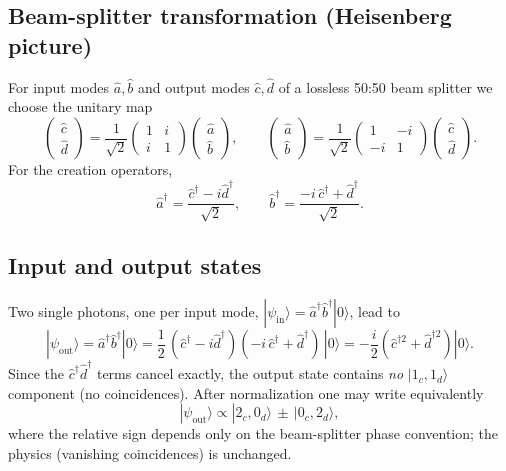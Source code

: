 \subsection*{Beam-splitter transformation (Heisenberg picture)}
For input modes \(\hat a,\hat b\) and output modes \(\hat c,\hat d\) of a lossless 50:50 beam splitter we choose the unitary map
\[
\begin{pmatrix}
	\hat c \\ \hat d
\end{pmatrix}
= \frac{1}{\sqrt{2}}
\begin{pmatrix}
	1 & i \\
	i & 1
\end{pmatrix}
\begin{pmatrix}
	\hat a \\ \hat b
\end{pmatrix},
\qquad
\begin{pmatrix}
	\hat a \\ \hat b
\end{pmatrix}
= \frac{1}{\sqrt{2}}
\begin{pmatrix}
	1 & -i \\
	-i & 1
\end{pmatrix}
\begin{pmatrix}
	\hat c \\ \hat d
\end{pmatrix}.
\]
For the creation operators,
\[
\hat a^\dagger=\frac{\hat c^\dagger - i \hat d^\dagger}{\sqrt{2}},
\qquad
\hat b^\dagger=\frac{-i\,\hat c^\dagger + \hat d^\dagger}{\sqrt{2}}.
\]

\subsection*{Input and output states}
Two single photons, one per input mode,
\(|\psi_{\text{in}}\rangle=\hat a^\dagger \hat b^\dagger |0\rangle\),
lead to
\[
|\psi_{\text{out}}\rangle
= \hat a^\dagger \hat b^\dagger |0\rangle
= \frac{1}{2}\,(\hat c^\dagger - i \hat d^\dagger)(-i\,\hat c^\dagger + \hat d^\dagger)\,|0\rangle
= -\frac{i}{2}\!\left(\hat c^{\dagger 2}+\hat d^{\dagger 2}\right)|0\rangle.
\]
Since the \(\hat c^\dagger \hat d^\dagger\) terms cancel exactly, the output state contains \emph{no} \(|1_c,1_d\rangle\) component (no coincidences). After normalization one may write equivalently
\[
|\psi_{\text{out}}\rangle
\propto |2_c,0_d\rangle \,\pm\, |0_c,2_d\rangle,
\]
where the relative sign depends only on the beam-splitter phase convention; the physics (vanishing coincidences) is unchanged.

